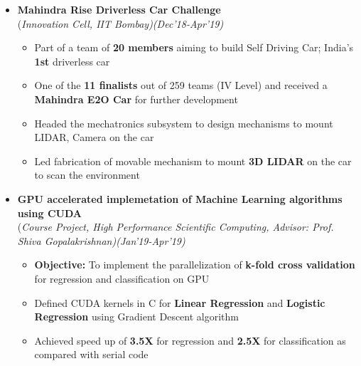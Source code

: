 \documentclass[a4paper,10pt]{article}
\begin{document}
\begin{itemize}
\item \textbf{Mahindra Rise Driverless Car Challenge}\\
(\emph{Innovation Cell, IIT Bombay)\hfill (Dec’18-Apr'19)} \\[-0.4cm]
	\begin{itemize}[noitemsep,nolistsep]
    \item Part of a team of \textbf{20 members} aiming to build Self Driving Car; India’s \textbf{1st} driverless car
    \item One of the \textbf{11 finalists} out of 259 teams (IV Level) and received a \textbf{Mahindra E2O Car} for further development
     \item Headed the mechatronics subsystem to design mechanisms to mount LIDAR, Camera on the car 
    \item Led fabrication of movable mechanism to mount \textbf{3D LIDAR} on the car to scan the environment 
	\end{itemize}
	
\item \textbf{GPU accelerated implemetation of Machine Learning algorithms using CUDA}\\
(\emph{Course Project, High Performance Scientific Computing, Advisor: Prof. Shiva Gopalakrishnan)\hfill (Jan'19-Apr’19)} \\[-0.4cm]
	\begin{itemize}[noitemsep,nolistsep]
	\item \textbf{Objective:} To implement the parallelization of \textbf{k-fold cross validation} for regression and classification on GPU
    \item Defined CUDA kernels in C for \textbf{Linear Regression} and \textbf{Logistic Regression} using Gradient Descent algorithm
    \item Achieved speed up of  \textbf{3.5X} for regression and \textbf{2.5X} for classification as compared with serial code
	\end{itemize}
	

\end{itemize}
\end{document}
